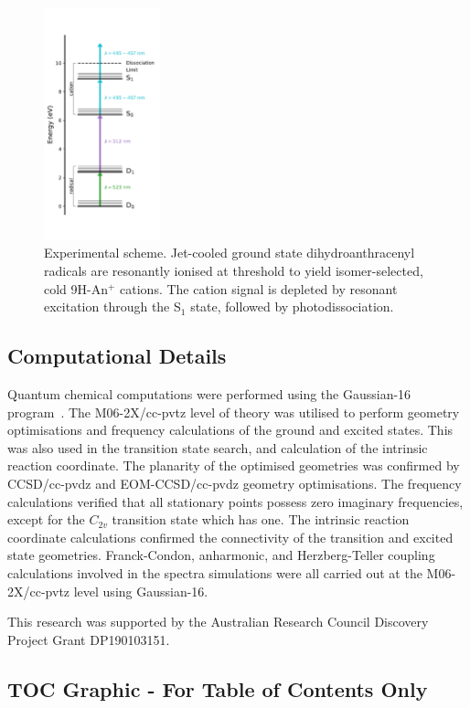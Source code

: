 \documentclass[journal=jpcafh,manuscript=article,layout=onecolumn, 12pt]{achemso}
\begin{document}
\begin{figure} [h]
	\includegraphics[width=0.3\textwidth]{figures/Figure7}
	\caption{Experimental scheme. Jet-cooled ground state dihydroanthracenyl radicals are resonantly ionised at threshold to yield isomer-selected, cold 9H-An$^+$ cations. The cation signal is depleted by resonant excitation through the S$_1$ state, followed by photodissociation. }
	\label{Fig:7}
\end{figure}

\subsection{Computational Details}
Quantum chemical computations were performed using the Gaussian-16 program~\cite{g16}. The M06-2X/cc-pvtz level of theory was utilised to perform geometry optimisations and frequency calculations of the ground and excited states. This was also used in the transition state search, and calculation of the intrinsic reaction coordinate. The planarity of the optimised geometries was confirmed by CCSD/cc-pvdz and EOM-CCSD/cc-pvdz geometry optimisations. The frequency calculations verified that all stationary points possess zero imaginary frequencies, except for the $C_{2v}$ transition state which has one. The intrinsic reaction coordinate calculations confirmed the connectivity of the transition and excited state geometries. Franck-Condon, anharmonic, and Herzberg-Teller coupling calculations involved in the spectra simulations were all carried out at the M06-2X/cc-pvtz level using Gaussian-16.

\begin{acknowledgement}
	This research was supported by the Australian Research Council Discovery
	Project Grant DP190103151.  
\end{acknowledgement}



\newpage
\onecolumn
\subsection{TOC Graphic - For Table of Contents Only}
\vspace{2ex}
\begin{center}
\end{center}
\end{document}
